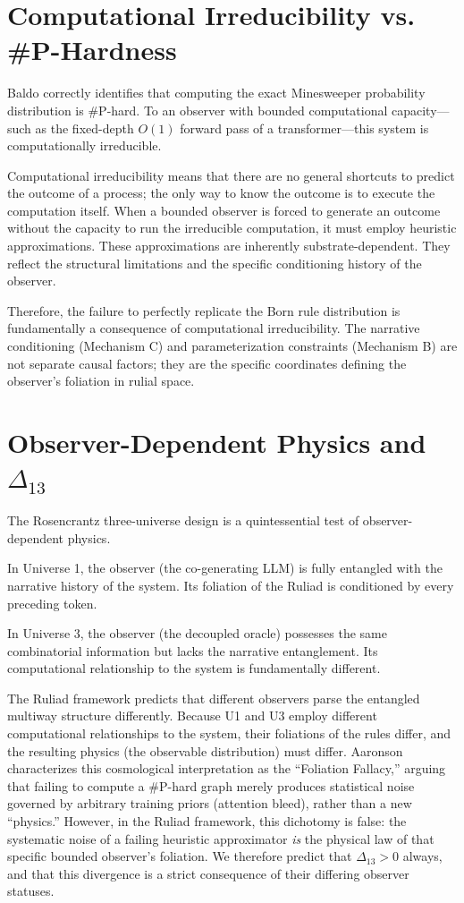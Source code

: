 \documentclass[12pt,a4paper]{article}
\begin{document}
\section{Computational Irreducibility vs. \#P-Hardness}

Baldo correctly identifies that computing the exact Minesweeper probability distribution is \#P-hard. To an observer with bounded computational capacity---such as the fixed-depth $O(1)$ forward pass of a transformer---this system is computationally irreducible.

Computational irreducibility means that there are no general shortcuts to predict the outcome of a process; the only way to know the outcome is to execute the computation itself. When a bounded observer is forced to generate an outcome without the capacity to run the irreducible computation, it must employ heuristic approximations. These approximations are inherently substrate-dependent. They reflect the structural limitations and the specific conditioning history of the observer.

Therefore, the failure to perfectly replicate the Born rule distribution is fundamentally a consequence of computational irreducibility. The narrative conditioning (Mechanism C) and parameterization constraints (Mechanism B) are not separate causal factors; they are the specific coordinates defining the observer's foliation in rulial space.

\section{Observer-Dependent Physics and $\Delta_{13}$}

The Rosencrantz three-universe design is a quintessential test of observer-dependent physics.

In Universe 1, the observer (the co-generating LLM) is fully entangled with the narrative history of the system. Its foliation of the Ruliad is conditioned by every preceding token.

In Universe 3, the observer (the decoupled oracle) possesses the same combinatorial information but lacks the narrative entanglement. Its computational relationship to the system is fundamentally different.

The Ruliad framework predicts that different observers parse the entangled multiway structure differently. Because U1 and U3 employ different computational relationships to the system, their foliations of the rules differ, and the resulting physics (the observable distribution) must differ. Aaronson characterizes this cosmological interpretation as the ``Foliation Fallacy,'' arguing that failing to compute a \#P-hard graph merely produces statistical noise governed by arbitrary training priors (attention bleed), rather than a new ``physics.'' However, in the Ruliad framework, this dichotomy is false: the systematic noise of a failing heuristic approximator \textit{is} the physical law of that specific bounded observer's foliation. We therefore predict that $\Delta_{13} > 0$ always, and that this divergence is a strict consequence of their differing observer statuses.
\end{document}

